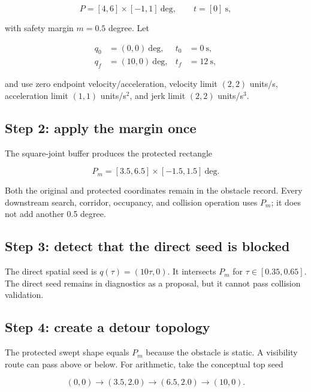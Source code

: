 \documentclass[10pt,letterpaper]{article}
\begin{document}
\begin{equation}
P=[4,6]\times[-1,1]\ \mathrm{deg},\qquad t=[0]\ \mathrm{s},
\end{equation}

with safety margin $m=0.5$ degree. Let

\begin{align*}
q_0&=(0,0)\ \mathrm{deg}, & t_0&=0\ \mathrm{s},\\
q_f&=(10,0)\ \mathrm{deg},& t_f&=12\ \mathrm{s},
\end{align*}

and use zero endpoint velocity/acceleration, velocity limit
$(2,2)$ units/s, acceleration limit $(1,1)$ units/s$^2$, and jerk limit
$(2,2)$ units/s$^3$.

\subsection{Step 2: apply the margin once}

The square-joint buffer produces the protected rectangle

\begin{equation}
P_m=[3.5,6.5]\times[-1.5,1.5]\ \mathrm{deg}.
\end{equation}

Both the original and protected coordinates remain in the obstacle record.
Every downstream search, corridor, occupancy, and collision operation uses
$P_m$; it does not add another 0.5 degree.

\subsection{Step 3: detect that the direct seed is blocked}

The direct spatial seed is $q(\tau)=(10\tau,0)$. It intersects $P_m$ for
$\tau\in[0.35,0.65]$. The direct seed remains in diagnostics as a proposal, but
it cannot pass collision validation.

\subsection{Step 4: create a detour topology}

The protected swept shape equals $P_m$ because the obstacle is static. A
visibility route can pass above or below. For arithmetic, take the conceptual
top seed

\begin{equation}
(0,0)\rightarrow(3.5,2.0)\rightarrow(6.5,2.0)\rightarrow(10,0).
\end{equation}
\end{document}
